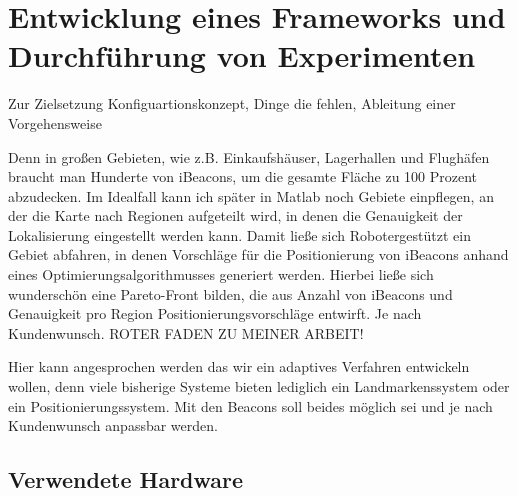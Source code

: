 \chapter{Entwicklung eines Frameworks und Durchführung von Experimenten}
Zur Zielsetzung Konfiguartionskonzept, Dinge die fehlen, Ableitung einer Vorgehensweise 

Denn in großen Gebieten, wie z.B. Einkaufshäuser, Lagerhallen und Flughäfen braucht man Hunderte von iBeacons, um die gesamte Fläche zu 100 Prozent abzudecken. Im Idealfall kann ich später in Matlab noch Gebiete einpflegen, an der die Karte nach Regionen aufgeteilt wird, in denen die Genauigkeit der Lokalisierung eingestellt werden kann. Damit ließe sich Robotergestützt ein Gebiet abfahren, in denen Vorschläge für die Positionierung von iBeacons anhand eines Optimierungsalgorithmusses generiert werden. Hierbei ließe sich wunderschön eine Pareto-Front bilden, die aus Anzahl von iBeacons und Genauigkeit pro Region Positionierungsvorschläge entwirft. Je nach Kundenwunsch. ROTER FADEN ZU MEINER ARBEIT!

Hier kann angesprochen werden das wir ein adaptives Verfahren entwickeln wollen, denn viele bisherige Systeme bieten lediglich ein Landmarkenssystem oder ein Positionierungssystem. Mit den Beacons soll beides möglich sei und je nach Kundenwunsch anpassbar werden.

\section{Verwendete Hardware}
